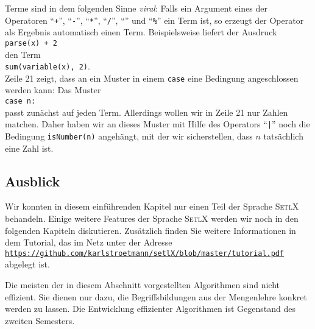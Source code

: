 Terme sind in dem folgenden Sinne \emph{viral}:  Falls ein Argument eines der Operatoren
``\texttt{+}'', ``\texttt{-}'', ``\texttt{*}'', ``\texttt{/}'', ``\texttt{}'' und
``\texttt{\%}''
ein Term ist, so erzeugt der Operator als Ergebnis automatisch einen Term.
Beispielsweise liefert der Ausdruck
\\[0.2cm]
\hspace*{1.3cm}
\texttt{parse(x) + 2}
\\[0.2cm]
den Term
\\[0.2cm]
\hspace*{1.3cm}
\texttt{sum(variable(x), 2)}.
\\[0.2cm]
Zeile 21 zeigt, dass an ein Muster in einem \texttt{case} eine Bedingung angeschlossen werden kann:
Das Muster
\\[0.2cm]
\hspace*{1.3cm}
\texttt{case n:}
\\[0.2cm]
passt zun\"{a}chst auf jeden Term.  Allerdings wollen wir in Zeile 21 nur Zahlen matchen.  Daher haben
wir an dieses Muster mit Hilfe des Operators ``\texttt{|}'' noch die Bedingung \texttt{isNumber(n)}
angeh\"{a}ngt, mit der wir sicherstellen, dass $n$ tats\"{a}chlich eine Zahl ist.


\subsection{Ausblick}
Wir konnten in diesem einf\"{u}hrenden Kapitel nur einen Teil der Sprache \textsc{SetlX}
behandeln.  Einige weitere Features
der Sprache \textsc{SetlX} werden wir noch in den folgenden Kapiteln diskutieren.
Zus\"{a}tzlich finden Sie
weitere Informationen  in dem Tutorial, das im Netz unter der Adresse
\\[0.2cm]
\hspace*{1.3cm}
\href{https://github.com/karlstroetmann/setlX/blob/master/tutorial.pdf}{\texttt{https://github.com/karlstroetmann/setlX/blob/master/tutorial.pdf}}
\\[0.2cm]
abgelegt ist.  

\remark
Die meisten der in diesem Abschnitt vorgestellten Algorithmen sind 
nicht effizient.  Sie dienen nur dazu, die Begriffsbildungen aus der Mengenlehre konkret
werden zu lassen.  Die Entwicklung effizienter Algorithmen ist Gegenstand des zweiten
Semesters. 




